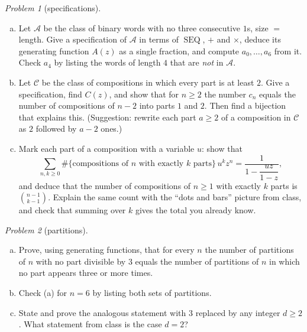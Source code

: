 \documentclass[11pt,twoside]{amsart}
\theoremstyle{plain}
\theoremstyle{remark}
\newtheorem{prob}{Problem}
\theoremstyle{definition}
\newcommand{\cA}{\mathcal A}
\newcommand{\SEQ}{\operatorname{SEQ}}
\begin{document}
\begin{prob}[specifications]
\begin{enumerate}[(a)]
\item Let $\cA$ be the class of binary words with no three consecutive $1$s, size $=$ length.
Give a specification of $\cA$ in terms of $\SEQ$, $+$ and $\times$, deduce its generating
function $A(z)$ as a single fraction, and compute $a_0,\dots,a_6$ from it. Check $a_4$ by
listing the words of length $4$ that are \emph{not} in $\cA$.
\item Let $\mathcal C$ be the class of compositions in which every part is at least $2$.
Give a specification, find $C(z)$, and show that for $n\ge2$ the number $c_n$ equals the number
of compositions of $n-2$ into parts $1$ and $2$. Then find a bijection that explains this.
(Suggestion: rewrite each part $a\ge2$ of a composition in $\mathcal C$ as $2$ followed by
$a-2$ ones.)
\item Mark each part of a composition with a variable $u$: show that
\[
\sum_{n,k\ge0}\#\{\text{compositions of $n$ with exactly $k$ parts}\}\,u^kz^n
=\frac{1}{1-\dfrac{uz}{1-z}},
\]
and deduce that the number of compositions of $n\ge1$ with exactly $k$ parts is
$\binom{n-1}{k-1}$. Explain the same count with the ``dots and bars'' picture from class, and
check that summing over $k$ gives the total you already know.
\end{enumerate}
\end{prob}

\begin{prob}[partitions]
\begin{enumerate}[(a)]
\item Prove, using generating functions, that for every $n$ the number of partitions of $n$
with no part divisible by $3$ equals the number of partitions of $n$ in which no part appears
three or more times.
\item Check (a) for $n=6$ by listing both sets of partitions.
\item State and prove the analogous statement with $3$ replaced by any integer $d\ge2$. What
statement from class is the case $d=2$?
\end{enumerate}
\end{prob}
\end{document}
